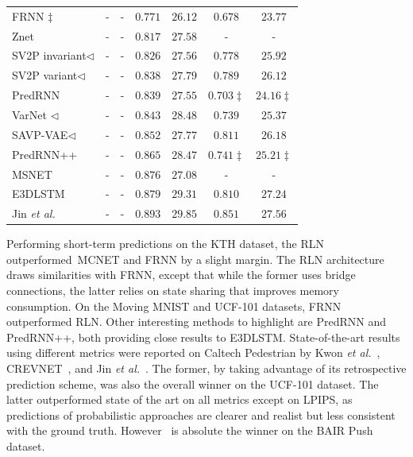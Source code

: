 \begin{table}[!t]
\begin{tabular} {@{}lcccccc@{}}
		\acs{FRNN} \cite{Oliu2018}$\ddag$ & - & - & $0.771$ & $26.12$ & $0.678$ & $23.77$ \\
		Znet \cite{Zhang2019} & - & - & $0.817$ & $27.58$ & - & - \\
		\ac{SV2P} invariant\cite{Babaeizadeh2018}$\triangleleft$ & - & - & $0.826$ & $27.56$ & $0.778$ & $25.92$ \\
		\ac{SV2P} variant\cite{Babaeizadeh2018}$\triangleleft$ & - & - & $0.838$ & $27.79$ & $0.789$ & $26.12$ \\
		PredRNN \cite{Wang2017} & - & - & $0.839$ & $27.55$ & $0.703\ddag$ & $24.16\ddag$ \\
		VarNet \cite{Jin2018}$\triangleleft$ & - & - & $0.843$ & $28.48$ & $0.739$ & $25.37$ \\
		\ac{SAVP}-VAE\cite{Lee2018}$\triangleleft$ & - & - & $0.852$ & $27.77$ & $0.811$ & $26.18$ \\
		PredRNN++ \cite{Wang2018} & - & - & $0.865$ & $28.47$ & $0.741\ddag$ & $25.21\ddag$ \\
		MSNET \cite{Lee2018a} & - & - & $0.876$ & $27.08$ & - & - \\
		\ac{E3DLSTM} \cite{Wang2019b} & - & - & $0.879$ & $29.31$ & $0.810$ & $27.24$ \\
		Jin \textit{et al.}\cite{Jin2020} & - & - & $\mathbf{0.893}$ & $\mathbf{29.85}$ & $\mathbf{0.851}$ & $\mathbf{27.56}$ \\
		\bottomrule
	\end{tabular}
\end{table}

Performing short-term predictions on the KTH dataset, the \ac{RLN} outperformed~\ac{MCNET} and \ac{FRNN} by a slight margin. The \ac{RLN} architecture draws similarities with \ac{FRNN}, except that while the former uses bridge connections, the latter relies on state sharing that improves memory consumption. On the Moving MNIST and UCF-101 datasets, \ac{FRNN} outperformed \ac{RLN}. Other interesting methods to highlight are PredRNN and PredRNN++, both providing close results to \ac{E3DLSTM}. State-of-the-art results using different metrics were reported on Caltech Pedestrian by Kwon \textit{et al.}~\cite{Kwon2019}, \ac{CREVNET}~\cite{Yu2020}, and Jin \textit{et al.}~\cite{Jin2020}. The former, by taking advantage of its retrospective prediction scheme, was also the overall winner on the UCF-101 dataset. The latter outperformed state of the art on all metrics except on \ac{LPIPS}, as predictions of probabilistic approaches are clearer and realist but less consistent with the ground truth. However~\cite{Jin2020} is absolute the winner on the BAIR Push dataset.

